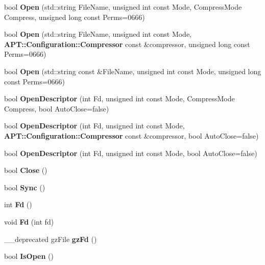 \begin{DoxyCompactItemize}
\item 
bool {\bfseries \-Open} (std\-::string \-File\-Name, unsigned int const \-Mode, \-Compress\-Mode \-Compress, unsigned long const \-Perms=0666)\label{classFileFd_aa599bb47c4170160fca202c44bc35fa6}

\item 
bool {\bfseries \-Open} (std\-::string \-File\-Name, unsigned int const \-Mode, {\bf \-A\-P\-T\-::\-Configuration\-::\-Compressor} const \&compressor, unsigned long const \-Perms=0666)\label{classFileFd_aebbc7c1063ea37ad75450bbde60e05eb}

\item 
bool {\bfseries \-Open} (std\-::string const \&\-File\-Name, unsigned int const \-Mode, unsigned long const \-Perms=0666)\label{classFileFd_a694bf39a8eabb34606f3d80c25054479}

\item 
bool {\bfseries \-Open\-Descriptor} (int \-Fd, unsigned int const \-Mode, \-Compress\-Mode \-Compress, bool \-Auto\-Close=false)\label{classFileFd_a06cdd9982425e1924a8601182ed9ab88}

\item 
bool {\bfseries \-Open\-Descriptor} (int \-Fd, unsigned int const \-Mode, {\bf \-A\-P\-T\-::\-Configuration\-::\-Compressor} const \&compressor, bool \-Auto\-Close=false)\label{classFileFd_a1da39c4012d04d006a7bd0a07b22b3c8}

\item 
bool {\bfseries \-Open\-Descriptor} (int \-Fd, unsigned int const \-Mode, bool \-Auto\-Close=false)\label{classFileFd_ad9a41d7782c99ce88e44c874965454a8}

\item 
bool {\bfseries \-Close} ()\label{classFileFd_aef7e3d18ef267f23f64ad397fa359cc1}

\item 
bool {\bfseries \-Sync} ()\label{classFileFd_a071d010e76ac762ffab420fcf90656a4}

\item 
int {\bfseries \-Fd} ()\label{classFileFd_ac100e6a92976247aa28eaeea810018d1}

\item 
void {\bfseries \-Fd} (int fd)\label{classFileFd_a447843c42b0eb8b762097bce70468a77}

\item 
\-\_\-\-\_\-deprecated gz\-File {\bfseries gz\-Fd} ()\label{classFileFd_a32d09f7b1f9db749c85269c2b44f5550}

\item 
bool {\bfseries \-Is\-Open} ()\label{classFileFd_a1822528b9d87e3897acff000f0ef4629}


\end{DoxyCompactItemize}
